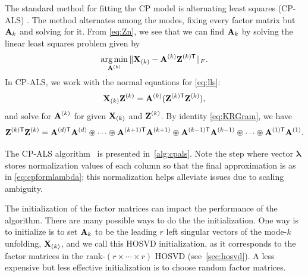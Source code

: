The standard method for fitting the CP model is alternating least
squares (CP-ALS) \cite{PARAFAC,Kolda:2009}. The method alternates
among the modes, fixing every factor matrix but $\Mn{A}{k}$ and
solving for it. From \cref{eq:Zn}, 
we see that we can find $\Mn{A}{k}$ by solving the linear least squares
problem given by
\begin{equation}
\label{eq:lls}
\argmin_{\M{A}^{(k)}} \|\M{X}_{(k)} - \M{A}^{(k)}\M{Z}^{(k)\trans}\|_F.
\end{equation}
In CP-ALS, we work with the normal equations for \cref{eq:lls}:
\begin{displaymath}
\M{X}_{(k)}\M{Z}^{(k)} = \M{A}^{(k)}(\M{Z}^{(k)\trans}\M{Z}^{(k)}),
\end{displaymath}
and solve for $\M{A}^{(k)}$ for given $\M{X}_{(k)}$ and $\M{Z}^{(k)}$.
By identity \cref{eq:KRGram}, we have 
\begin{displaymath}
\M{Z}^{(k)\trans}\M{Z}^{(k)} = \M{A}^{(d)\trans}\M{A}^{(d)} \circledast \dots \circledast \M{A}^{(k+1)\trans}\M{A}^{(k+1)} \circledast \M{A}^{(k-1)\trans}\M{A}^{(k-1)} \circledast \cdots \circledast \M{A}^{(1)\trans}\M{A}^{(1)}.
\end{displaymath}

The CP-ALS algorithm~\cite{Kolda:2009} is presented
in~\cref{alg:cpals}. Note the step where vector $\bm{\lambda}$ stores
normalization values of each column so that the final approximation is
as in \cref{eq:cpformlambda}; this normalization helps alleviate
issues due to scaling ambiguity.

The initialization of the factor matrices
can impact the performance of the algorithm.
There are many possible ways to do the the initialization.
One way is to
initialize is to set $\Mn{A}{k}$ to be the leading $r$ left singular
vectors of the mode-$k$ unfolding, $\M{X}_{(k)}$, and we call this
HOSVD initialization, as it corresponds to the factor matrices
in the rank-$(r{\times} {\cdots} {\times} r)$ HOSVD (see~\cref{sec:hosvd}). 
A less expensive but less effective initialization is to
choose random factor matrices.

